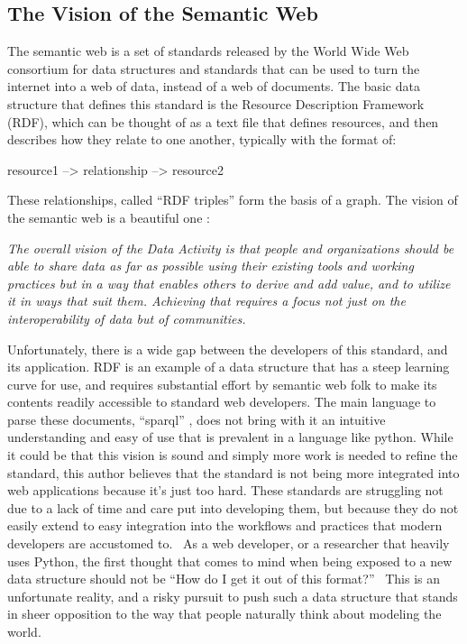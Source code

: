 \documentclass{report}
\begin{document}
\subsection{The Vision of the Semantic Web}
The semantic web is a set of standards released by the World Wide Web
consortium for data structures and standards \cite{noauthor_undated-by} that
can be used to turn the internet into a web of data, instead of a web of
documents. The basic data structure that defines this standard is the
Resource Description Framework (RDF), which can be thought of as a text
file that defines resources, and then describes how they relate to one
another, typically with the format of:

resource1 --> relationship --> resource2

These relationships, called ``RDF triples'' form the basis of a graph.
The vision of the semantic web is a beautiful one \cite{noauthor_undated-by}:

\textit{The overall vision of the Data Activity is that people and organizations
should be able to share data as far as possible using their existing
tools and working practices but in a way that enables others to derive
and add value, and to utilize it in ways that suit them. Achieving that
requires a focus not just on the interoperability of data but of
communities.}

Unfortunately, there is a wide gap between the developers of this
standard, and its application. RDF is an example of a data structure
that has a steep learning curve for use, and requires substantial effort
by semantic web folk to make its contents readily accessible to standard
web developers. The main language to parse these documents, ``sparql'' \cite{noauthor_undated-hy},
does not bring with it an intuitive understanding and easy of use that
is prevalent in a language like python. While it could be that this
vision is sound and simply more work is needed to refine the standard,
this author believes that the standard is not being more integrated into
web applications because it's just too hard. These standards are
struggling not due to a lack of time and care put into developing them,
but because they do not easily extend to easy integration into the
workflows and practices that modern developers are accustomed to. ~As a
web developer, or a researcher that heavily uses Python, the first
thought that comes to mind when being exposed to a new data structure
should not be ``How do I get it out of this format?'' ~This is an
unfortunate reality, and a risky pursuit to push such a data structure
that stands in sheer opposition to the way that people naturally think
about modeling the world.
\end{document}
